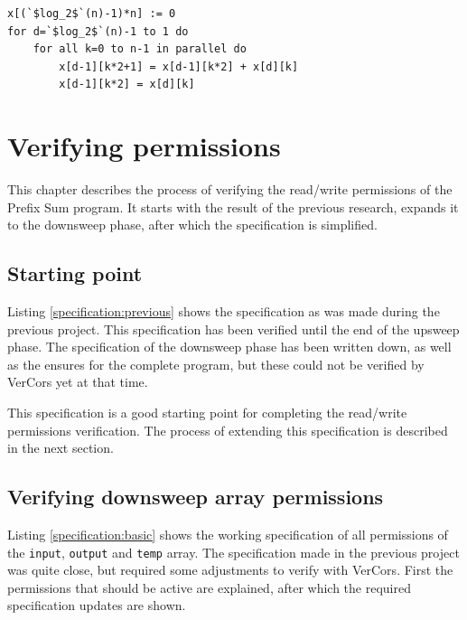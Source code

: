 \documentclass[a4paper]{article}
\newcommand{\code}[1]{\texttt{\small \color{inline}#1}} %
\begin{document}
\begin{lstlisting}[caption=Downsweep phase, label=prefixSumDownsweep, float=htpb]
x[(`$log_2$`(n)-1)*n] := 0
for d=`$log_2$`(n)-1 to 1 do
	for all k=0 to n-1 in parallel do
		x[d-1][k*2+1] = x[d-1][k*2] + x[d][k]
		x[d-1][k*2] = x[d][k]
\end{lstlisting}
\FloatBarrier


\section{Verifying permissions}\label{chapter:verifyingPermissions}
This chapter describes the process of verifying the read/write permissions of the Prefix Sum program. It starts with the result of the previous research, expands it to the downsweep phase, after which the specification is simplified.

\subsection{Starting point}
Listing \ref{specification:previous} shows the specification as was made during the previous project. This specification has been verified until the end of the upsweep phase. The specification of the downsweep phase has been written down, as well as the ensures for the complete program, but these could not be verified by VerCors yet at that time.

This specification is a good starting point for completing the read/write permissions verification. The process of extending this specification is described in the next section.



\subsection{Verifying downsweep array permissions}
Listing \ref{specification:basic} shows the working specification of all permissions of the \code{input}, \code{output} and \code{temp} array. The specification made in the previous project was quite close, but required some adjustments to verify with VerCors. First the permissions that should be active are explained, after which the required specification updates are shown.
\end{document}
